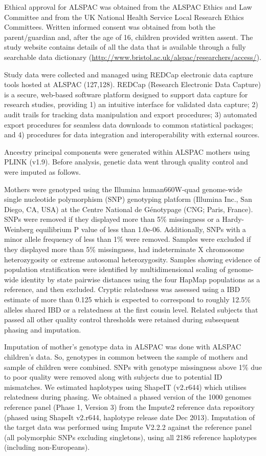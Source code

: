 \documentclass[11pt,oneside]{bristolthesis}
\begin{document}
Ethical approval for ALSPAC was obtained from the ALSPAC Ethics and Law Committee and from the UK National Health Service Local Research Ethics Committees. Written informed consent was obtained from both the parent/guardian and, after the age of 16, children provided written assent. The study website contains details of all the data that is available through a fully searchable data dictionary (\url{http://www.bristol.ac.uk/alspac/researchers/access/}).

Study data were collected and managed using REDCap electronic data capture tools hosted at ALSPAC (127,128). REDCap (Research Electronic Data Capture) is a secure, web-based software platform designed to support data capture for research studies, providing 1) an intuitive interface for validated data capture; 2) audit trails for tracking data manipulation and export procedures; 3) automated export procedures for seamless data downloads to common statistical packages; and 4) procedures for data integration and interoperability with external sources.

Ancestry principal components were generated within ALSPAC mothers using PLINK (v1.9). Before analysis, genetic data went through quality control and were imputed as follows.

Mothers were genotyped using the Illumina human660W-quad genome-wide single nucleotide polymorphism (SNP) genotyping platform (Illumina Inc., San Diego, CA, USA) at the Centre National de Génotypage (CNG; Paris, France). SNPs were removed if they displayed more than 5\% missingness or a Hardy-Weinberg equilibrium P value of less than 1.0e-06. Additionally, SNPs with a minor allele frequency of less than 1\% were removed. Samples were excluded if they displayed more than 5\% missingness, had indeterminate X chromosome heterozygosity or extreme autosomal heterozygosity. Samples showing evidence of population stratification were identified by multidimensional scaling of genome-wide identity by state pairwise distances using the four HapMap populations as a reference, and then excluded. Cryptic relatedness was assessed using a IBD estimate of more than 0.125 which is expected to correspond to roughly 12.5\% alleles shared IBD or a relatedness at the first cousin level. Related subjects that passed all other quality control thresholds were retained during subsequent phasing and imputation.

Imputation of mother's genotype data in ALSPAC was done with ALSPAC children's data. So, genotypes in common between the sample of mothers and sample of children were combined. SNPs with genotype missingness above 1\% due to poor quality were removed along with subjects due to potential ID mismatches. We estimated haplotypes using ShapeIT (v2.r644) which utilises relatedness during phasing. We obtained a phased version of the 1000 genomes reference panel (Phase 1, Version 3) from the Impute2 reference data repository (phased using ShapeIt v2.r644, haplotype release date Dec 2013). Imputation of the target data was performed using Impute V2.2.2 against the reference panel (all polymorphic SNPs excluding singletons), using all 2186 reference haplotypes (including non-Europeans).
\end{document}

